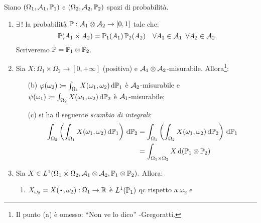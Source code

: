 \medskip
\begin{teo}
  Siano $(\Omega_1,\mathcal A_1,\mathbb P_1)$ e $(\Omega_2,\mathcal A_2,\mathbb P_2)$ spazi di probabilità.
  \begin{enumerate}
    \item $\exists\,!$ la probabilità $\mathbb P:\mathcal A_1\otimes\mathcal A_2 \to\left [0, 1 \right ]$ tale che:
    $$\mathbb P(A_1\times A_2)=\mathbb P_1(A_1) \, \mathbb P_2(A_2) \quad \forall A_1 \in \mathcal A_1 \enspace \forall A_2 \in \mathcal A_2$$
    Scriveremo $\mathbb P=\mathbb P_1\otimes\mathbb P_2$.
    \item Sia $X: \Omega_1 \times \Omega_2 \to\left [0, {+\infty} \right ]$ (positiva) e $\mathcal A_1\otimes\mathcal A_2$-misurabile. Allora\footnote{
    Il punto (a) è omesso: ``Non ve lo dico'' -Gregoratti.
    }:
    \begin{enumerate}
      \renewcommand{\labelenumi}{\alph{enumi})}
      \item[(b)] $\varphi(\omega_2) \coloneqq \int_{\Omega_1}X(\omega_1,\omega_2) \, \mathrm d \mathbb P_1$ è $\mathcal A_2$-misurabile e \\
       $\psi(\omega_1) \coloneqq \int_{\Omega_2}X(\omega_1,\omega_2) \, \mathrm d \mathbb P_2$ è $\mathcal A_1$-misurabile;
      \item[(c)] si ha il seguente \textit{scambio di integrali}:
      \begin{align*}
        \int_{\Omega_2} \left( \int_{\Omega_1}X(\omega_1,\omega_2) \, \mathrm d \mathbb P_1 \right) \, \mathrm d \mathbb P_2
        &=\int_{\Omega_1} \left(\int_{\Omega_2}X(\omega_1,\omega_2) \, \mathrm d \mathbb P_2 \right) \, \mathrm d \mathbb P_1\\
        &=\int_{\Omega_1 \times \Omega_2}X \, \mathrm d (\mathbb P_1 \otimes \mathbb P_2)
      \end{align*}
    \end{enumerate}
  \item Sia $X\in L^1(\Omega_1 \times \Omega_2,\mathcal A_1\otimes\mathcal A_2, \mathbb P_1\otimes\mathbb P_2).$ Allora:
      \begin{enumerate}
      \renewcommand{\labelenumi}{\alph{enumi})}
      \item $X_{\omega_2} = X(\, \bigcdot \, ,\omega_2):\Omega_1 \to \RR$ è $L^1(\mathbb P_1)$ qc rispetto a $\omega_2$ e \\

\end{enumerate}
\end{enumerate}
\end{teo}

